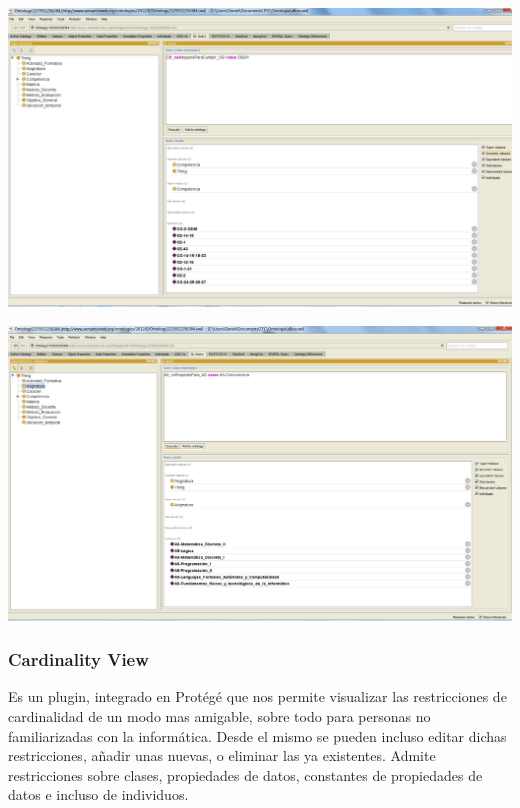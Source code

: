 
\begin{center}
		\includegraphics[width=1.00\textwidth]{Imagenes/Herramientas-DLQuery1.png}
\end{center}
\begin{center}
		\includegraphics[width=1.00\textwidth]{Imagenes/Herramientas-DLQuery2.png}
\end{center}

\subsubsection{Cardinality View} Es un plugin, integrado en Protégé que nos permite visualizar las restricciones de cardinalidad de un modo mas amigable, sobre todo para personas no familiarizadas con la informática. Desde el mismo se pueden incluso editar dichas restricciones, añadir unas nuevas, o eliminar las ya existentes. Admite restricciones sobre clases, propiedades de datos, constantes de propiedades de datos e incluso de individuos.

